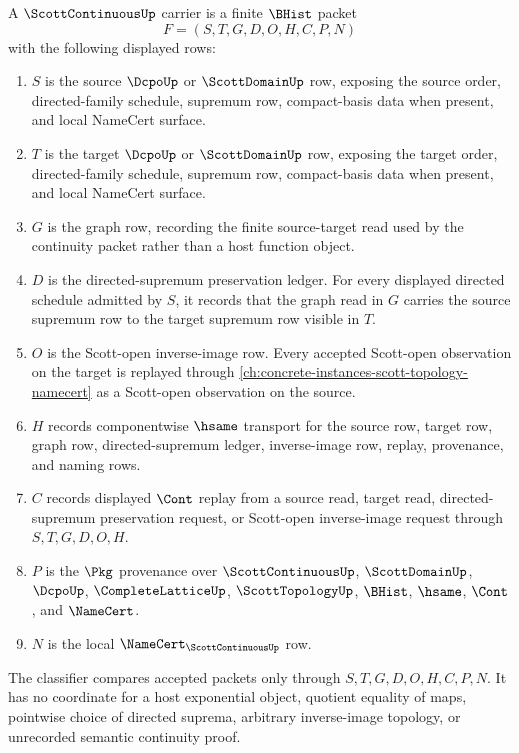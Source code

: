 \begin{definition}
\label{def:scott-continuous-carrier}
A $\ScottContinuousUp$ carrier is a finite $\BHist$ packet
$$
F=(S,T,G,D,O,H,C,P,N)
$$
with the following displayed rows:
\begin{enumerate}
\item $S$ is the source $\DcpoUp$ or $\ScottDomainUp$ row, exposing the source order, directed-family schedule, supremum row, compact-basis data when present, and local NameCert surface.
\item $T$ is the target $\DcpoUp$ or $\ScottDomainUp$ row, exposing the target order, directed-family schedule, supremum row, compact-basis data when present, and local NameCert surface.
\item $G$ is the graph row, recording the finite source-target read used by the continuity packet rather than a host function object.
\item $D$ is the directed-supremum preservation ledger. For every displayed directed schedule admitted by $S$, it records that the graph read in $G$ carries the source supremum row to the target supremum row visible in $T$.
\item $O$ is the Scott-open inverse-image row. Every accepted Scott-open observation on the target is replayed through \autoref{ch:concrete-instances-scott-topology-namecert} as a Scott-open observation on the source.
\item $H$ records componentwise $\hsame$ transport for the source row, target row, graph row, directed-supremum ledger, inverse-image row, replay, provenance, and naming rows.
\item $C$ records displayed $\Cont$ replay from a source read, target read, directed-supremum preservation request, or Scott-open inverse-image request through $S,T,G,D,O,H$.
\item $P$ is the $\Pkg$ provenance over $\ScottContinuousUp$, $\ScottDomainUp$, $\DcpoUp$, $\CompleteLatticeUp$, $\ScottTopologyUp$, $\BHist$, $\hsame$, $\Cont$, and $\NameCert$.
\item $N$ is the local $\NameCert_{\ScottContinuousUp}$ row.
\end{enumerate}
The classifier compares accepted packets only through $S,T,G,D,O,H,C,P,N$. It has no coordinate for a host exponential object, quotient equality of maps, pointwise choice of directed suprema, arbitrary inverse-image topology, or unrecorded semantic continuity proof.
\end{definition}

